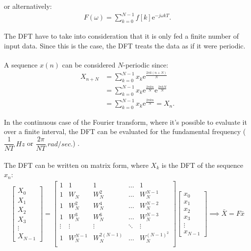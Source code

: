 or alternatively:
\begin{align*}
	F(\omega) = \sum_{k=0}^{N-1}f[k]\text{e}^{-j\omega k T}.
\end{align*}


The DFT have to take into consideration that it is only fed a finite number of input data. Since this is the case, the DFT treats the data as if it were periodic.
\\ \\
A sequence $x(n)$ can be considered $N$-periodic since:
\begin{align*}
	X_{n+N}
	&= \sum_{k=0}^{N-1} x_k \text{e}^{\frac{2 \pi k (n+N)}{N}}		\\
	&= \sum_{k=0}^{N-1} x_k \text{e}^{\frac{2 \pi k n}{N}}			\text{e}^{\frac{2 \pi k N}{N}} \\
	&= \sum_{k=0}^{N-1} x_k \text{e}^{\frac{2 \pi k n}{N}} = 		X_n.
\end{align*}

In the continuous case of the Fourier transform, where it's possible to evaluate it over a finite interval, the DFT can be evaluated for the fundamental frequency ($\dfrac{1}{NT} \ Hz$ or $\dfrac{2\pi}{NT} \ rad/sec.$) \cite{DFT_OX}.
%
\\ \\
The DFT can be written on matrix form, where $X_k$ is the DFT of the sequence $x_n$:
\begin{align} \label{eq:DFT_matrix}
	\begin{bmatrix}
		X_0\\ X_1\\ X_2\\ X_3 \\ \vdots \\ X_{N-1}
	\end{bmatrix}
	=
	\begin{bmatrix}
		1 & 1 	& 1   	& \hdots & 1\\
		1 & W_N 	& W_N^2 	& \hdots & W_N^{N-1} \\
		1 & W_N^2	& W_N^4	& \hdots & W_N^{N-2} \\
		1 & W_N^3	& W_N^6	& \hdots & W_N^{N-3} \\
		\vdots & \vdots & \vdots & \ddots & \vdots \\
		1 & W_N^{N-1}	& W_N^{2(N-1)}	& \hdots & 						W_N^{(N-1)^2} \\
	\end{bmatrix}
	\begin{bmatrix}
		x_0\\ x_1\\ x_2\\ x_3\\ \vdots \\ x_{N-1}
	\end{bmatrix} 
	\implies
	\bar{X} = F\bar{x} 
\end{align}

